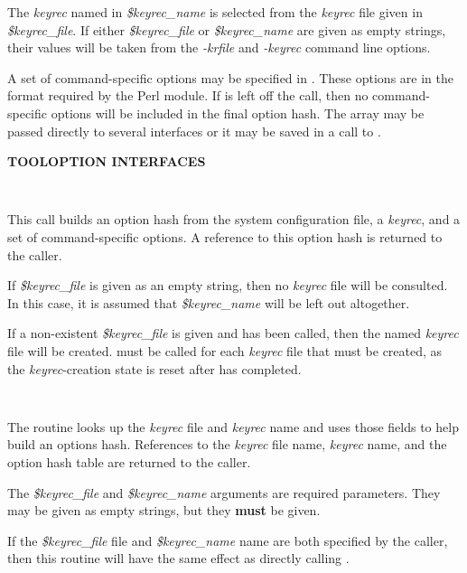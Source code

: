 The {\it keyrec} named in {\it \$keyrec\_name} is selected from the {\it keyrec}
file given in {\it \$keyrec\_file}.  If either {\it \$keyrec\_file} or {\it
\$keyrec\_name} are given as empty strings, their values will be taken from the
{\it -krfile} and {\it -keyrec} command line options.

A set of command-specific options may be specified in {\it \@csopts}.  These
options are in the format required by the  Perl module.
If {\it \@csopts} is left off the call, then no command-specific options will
be included in the final option hash.  The {\it \@csopts} array may be passed
directly to several interfaces or it may be saved in a call to
.

{\bf TOOLOPTION INTERFACES}

\begin{description}

\item {}\verb" "

This  call builds an option hash from the system
configuration file, a {\it keyrec}, and a set of command-specific options.
A reference to this option hash is returned to the caller.

If {\it \$keyrec\_file} is given as an empty string, then no {\it keyrec} file
will be consulted.  In this case, it is assumed that {\it \$keyrec\_name} will
be left out altogether.

If a non-existent {\it \$keyrec\_file} is given and  has
been called, then the named {\it keyrec} file will be created.
 must be called for each {\it keyrec} file that must be
created, as the  {\it keyrec}-creation state is reset after
 has completed.

\item {}\verb" "

The  routine looks up the {\it keyrec} file and {\it
keyrec} name and uses those fields to help build an options hash.  References
to the {\it keyrec} file name, {\it keyrec} name, and the option hash table
are returned to the caller.

The {\it \$keyrec\_file} and {\it \$keyrec\_name} arguments are required
parameters.  They may be given as empty strings, but they {\bf must} be given.

If the {\it \$keyrec\_file} file and {\it \$keyrec\_name} name are both
specified by the caller, then this routine will have the same effect as
directly calling .


\end{description}
